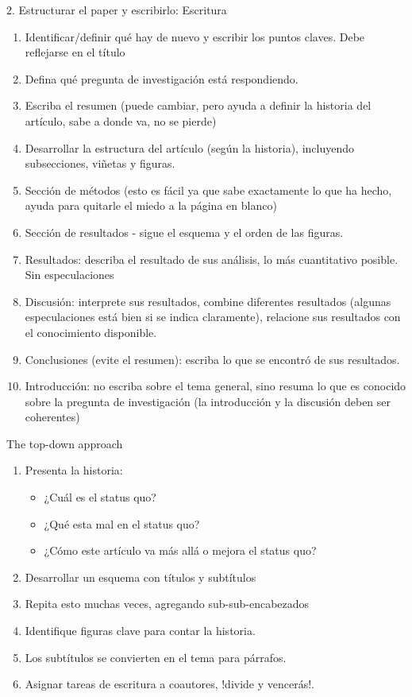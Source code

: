 \documentclass[
10pt,
aspectratio=169,
]{beamer}
\begin{document}
\begin{frame}{2. Estructurar el paper y escribirlo: Escritura}
\begin{enumerate}
\item Identificar/definir qué hay de nuevo y escribir los puntos claves. Debe reflejarse en el título
\item Defina qué pregunta de investigación está respondiendo.
\item Escriba el resumen (puede cambiar, pero ayuda a definir la historia del artículo, sabe a donde va, no se pierde)
\item Desarrollar la estructura del artículo (según la historia), incluyendo subsecciones, viñetas y figuras.
\item Sección de métodos (esto es fácil ya que sabe exactamente lo que ha hecho, ayuda para quitarle el miedo a la página en blanco)
\item Sección de resultados - sigue el esquema y el orden de las figuras. 
\item Resultados: describa el resultado de sus análisis, lo más cuantitativo posible. Sin especulaciones
\item Discusión: interprete sus resultados, combine diferentes resultados (algunas especulaciones está bien si se indica claramente), relacione sus resultados con el conocimiento disponible.
\item Conclusiones (evite el resumen): escriba lo que se encontr\'o de sus resultados.
\item Introducción: no escriba sobre el tema general, sino resuma lo que es conocido sobre la pregunta de investigación (la introducción y la discusión deben ser coherentes)
\end{enumerate}
\end{frame}


\begin{frame}{The top-down approach}
\begin{enumerate}
\item Presenta la historia:
\begin{itemize}
\item ¿Cuál es el status quo?
\item ¿Qué esta mal en el status quo?
\item ¿Cómo este art\'iculo va m\'as all\'a o mejora el status quo?
\end{itemize}
\item Desarrollar un esquema con títulos y subtítulos
\item Repita esto muchas veces, agregando sub-sub-encabezados
\item Identifique figuras clave para contar la historia.
\item Los subtítulos se convierten en el tema para párrafos.
\item Asignar tareas de escritura a coautores, !divide y vencerás!.
\end{enumerate}
\end{frame}
\end{document}
